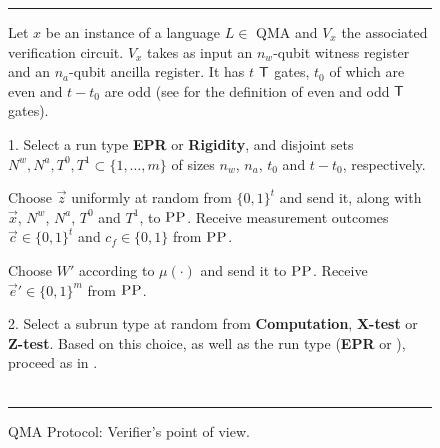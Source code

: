 \documentclass{toc}
\newcommand{\pp}{\textsc{PP}}
\begin{document}
\begin{figure}[H]
\rule[1ex]{\textwidth}{0.5pt}
\vspace{-20pt}
\justify
Let $x$ be an instance of a language $L \in$ QMA and $V_x$ the associated verification circuit. $V_x$ takes as input  an $n_w$-qubit witness register and an $n_a$-qubit ancilla register. It has $t$ $\sf T$ gates, $t_0$ of which are even and $t-t_0$ are odd (see  for the definition of even and odd $\sf T$ gates).

\justify
\vspace{-0.25cm}   %
1. Select a run type \textbf{EPR} or \textbf{Rigidity}, and disjoint sets
  $N^w,N^a, T^0,T^1\subset \{1,\ldots,m\}$ of sizes $n_w$, $n_a$,  $t_0$ and $t-t_0$, respectively.  %
\begin{description}
\setlength\itemsep{-0.17em}   %
\item[EPR] Choose $\vec{z}$ uniformly at random from $\{0,1\}^t$ and send it,
  along with $\vec{x}$, $N^w$, $N^a$, $T^0$ and $T^1$, to $\pp$. Receive measurement outcomes $\vec{c}\in\{0,1\}^t$ and $c_f\in\{0,1\}$ from $\pp$.
\item[Rigidity] Choose $W'$ according to $\mu(\cdot)$ and send it to $\pp$. Receive $\vec{e}'\in \{0,1\}^m$ from $\pp$. 
\end{description}
\vspace{-0.17cm}    %
2. Select a subrun type at random from \textbf{Computation}, \textbf{X-test} or \textbf{Z-test}. Based on this choice, as well as the run type (\textbf{EPR} or ), proceed as in 
%
%
. \\   %
~\\    %
\rule[2ex]{\textwidth}{0.5pt}\vspace{-.5cm}  %
\caption{QMA Protocol: Verifier's point of view.}\label{fig:qma-protocol-V}
\end{figure}
\end{document}
